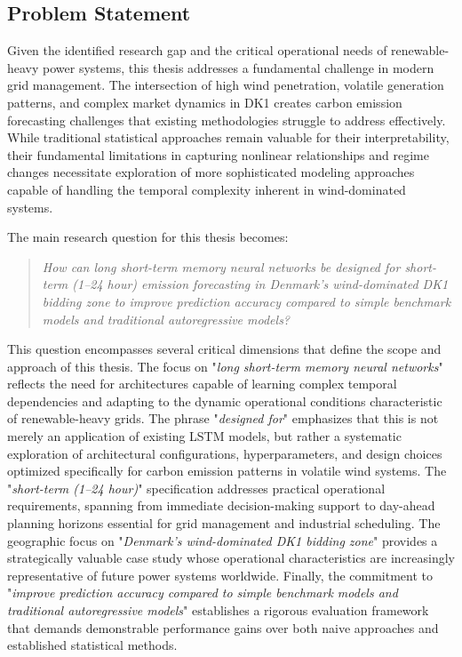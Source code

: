 \subsection{Problem Statement}

\newcommand{\researchquestion}{
    \begin{quote}
        \textit{How can long short-term memory neural networks be designed for short-term (1--24 hour) \cotwo{} emission forecasting in Denmark's wind-dominated DK1 bidding zone to improve prediction accuracy compared to simple benchmark models and traditional autoregressive models?}
    \end{quote}
}

Given the identified research gap and the critical operational needs of renewable-heavy power systems, this thesis addresses a fundamental challenge in modern grid management. The intersection of high wind penetration, volatile generation patterns, and complex market dynamics in DK1 creates carbon emission forecasting challenges that existing methodologies struggle to address effectively. While traditional statistical approaches remain valuable for their interpretability, their fundamental limitations in capturing nonlinear relationships and regime changes necessitate exploration of more sophisticated modeling approaches capable of handling the temporal complexity inherent in wind-dominated systems.

The main research question for this thesis becomes: \researchquestion{}

This question encompasses several critical dimensions that define the scope and approach of this thesis. The focus on "\textit{long short-term memory neural networks}" reflects the need for architectures capable of learning complex temporal dependencies and adapting to the dynamic operational conditions characteristic of renewable-heavy grids. The phrase "\textit{designed for}" emphasizes that this is not merely an application of existing LSTM models, but rather a systematic exploration of architectural configurations, hyperparameters, and design choices optimized specifically for carbon emission patterns in volatile wind systems. The "\textit{short-term (1--24 hour)}" specification addresses practical operational requirements, spanning from immediate decision-making support to day-ahead planning horizons essential for grid management and industrial scheduling. The geographic focus on "\textit{Denmark's wind-dominated DK1 bidding zone}" provides a strategically valuable case study whose operational characteristics are increasingly representative of future power systems worldwide. Finally, the commitment to "\textit{improve prediction accuracy compared to simple benchmark models and traditional autoregressive models}" establishes a rigorous evaluation framework that demands demonstrable performance gains over both naive approaches and established statistical methods.

